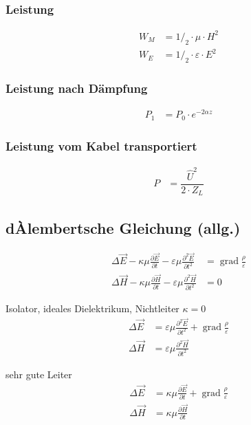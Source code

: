 \subsubsection{Leistung}

\begin{align*}
    W_{M} & = 1/_2\cdot\mu\cdot H^2         \\
    W_{E} & = 1/_2\cdot\varepsilon\cdot E^2
\end{align*}

\subsubsection{Leistung nach Dämpfung}

\begin{align*}
    P_1 & = P_0 \cdot e^{-2\alpha z}
\end{align*}

\subsubsection{Leistung vom Kabel transportiert}

\begin{align*}
    P & = \dfrac{\hat{U}^2}{2\cdot Z_L}
\end{align*}

\subsection{dÀlembertsche Gleichung (allg.)}
\begin{align*}
    \Delta \vec{E}-\kappa \mu \frac{\partial \vec{E}}{\partial t}-\varepsilon \mu \frac{\partial^{2} \vec{E}}{\partial t^{2}} & = \operatorname{grad} \frac{\rho}{\varepsilon} \\
    \Delta \vec{H}-\kappa \mu \frac{\partial \vec{H}}{\partial t}-\varepsilon \mu \frac{\partial^{2} \vec{H}}{\partial t^{2}} & = 0
\end{align*}

Isolator, ideales Dielektrikum, Nichtleiter $\kappa = 0$
\begin{align*}
    \Delta \vec{E} & =\varepsilon \mu \frac{\partial^{2} \vec{E}}{\partial t^{2}}+\operatorname{grad} \frac{\rho}{\varepsilon} \\
    \Delta \vec{H} & =\varepsilon \mu \frac{\partial^{2} \vec{H}}{\partial t^{2}}
\end{align*}

sehr gute Leiter
\begin{align*}
    \Delta \vec{E} & =\kappa \mu \frac{\partial \vec{E}}{\partial t}+\operatorname{grad} \frac{\rho}{\varepsilon} \\
    \Delta \vec{H} & =\kappa \mu \frac{\partial \vec{H}}{\partial t}
\end{align*}

